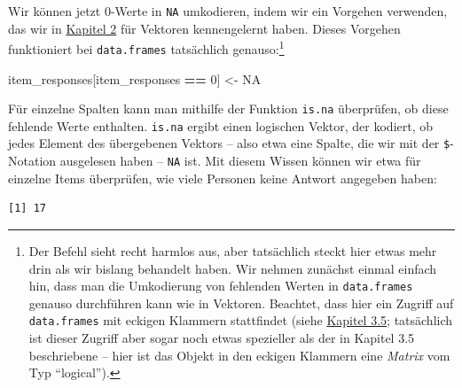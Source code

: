 \documentclass[12pt,]{tufte-book}
\newenvironment{Shaded}{\begin{snugshade}}{\end{snugshade}}
\newcommand{\KeywordTok}[1]{\textcolor[rgb]{0.13,0.29,0.53}{\textbf{#1}}}
\newcommand{\DecValTok}[1]{\textcolor[rgb]{0.00,0.00,0.81}{#1}}
\newcommand{\StringTok}[1]{\textcolor[rgb]{0.31,0.60,0.02}{#1}}
\newcommand{\OtherTok}[1]{\textcolor[rgb]{0.56,0.35,0.01}{#1}}
\newcommand{\OperatorTok}[1]{\textcolor[rgb]{0.81,0.36,0.00}{\textbf{#1}}}
\newcommand{\NormalTok}[1]{#1}
\theoremstyle{definition}
\theoremstyle{definition}
\theoremstyle{definition}
\theoremstyle{remark}
\begin{document}
Wir können jetzt 0-Werte in \texttt{NA} umkodieren, indem wir ein
Vorgehen verwenden, das wir in \protect\hyperlink{vektorAendern}{Kapitel
2} für Vektoren kennengelernt haben. Dieses Vorgehen funktioniert bei
\texttt{data.frames} tatsächlich genauso:\footnote{Der Befehl sieht
  recht harmlos aus, aber tatsächlich steckt hier etwas mehr drin als
  wir bislang behandelt haben. Wir nehmen zunächst einmal einfach hin,
  dass man die Umkodierung von fehlenden Werten in \texttt{data.frames}
  genauso durchführen kann wie in Vektoren. Beachtet, dass hier ein
  Zugriff auf \texttt{data.frames} mit eckigen Klammern stattfindet
  (siehe \protect\hyperlink{fortgeschritten}{Kapitel 3.5}; tatsächlich
  ist dieser Zugriff aber sogar noch etwas spezieller als der in Kapitel
  3.5 beschriebene -- hier ist das Objekt in den eckigen Klammern eine
  \emph{Matrix} vom Typ ``logical'').}

\begin{Shaded}
\begin{Highlighting}[]
\NormalTok{item_responses[item_responses }\OperatorTok{==}\StringTok{ }\DecValTok{0}\NormalTok{] <-}\StringTok{ }\OtherTok{NA}
\end{Highlighting}
\end{Shaded}

Für einzelne Spalten kann man mithilfe der Funktion \texttt{is.na}
überprüfen, ob diese fehlende Werte enthalten. \texttt{is.na} ergibt
einen logischen Vektor, der kodiert, ob jedes Element des übergebenen
Vektors -- also etwa eine Spalte, die wir mit der \texttt{\$}-Notation
ausgelesen haben -- \texttt{NA} ist. Mit diesem Wissen können wir etwa
für einzelne Items überprüfen, wie viele Personen keine Antwort
angegeben haben:

\begin{Shaded}
\end{Shaded}

\begin{verbatim}
[1] 17
\end{verbatim}

\begin{Shaded}
\end{Shaded}
\end{document}

